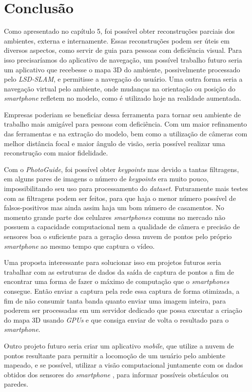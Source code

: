 \chapter{Conclusão}
Como apresentado no capítulo 5, foi possível obter reconstruções parciais dos ambientes, externa e internamente. Essas reconstruções podem ser úteis em diversos aspectos, como servir de guia para pessoas com deficiência visual. Para isso precisaríamos do aplicativo de navegação, um possível trabalho futuro seria um aplicativo que recebesse o mapa 3D do ambiente, possivelmente processado pelo \textit{LSD-SLAM}, e permitisse a navegação do usuário. Uma outra forma seria a navegação virtual pelo ambiente, onde mudanças na orientação ou posição do \textit{smartphone} refletem no modelo, como é utilizado hoje na realidade aumentada.

Empresas poderiam se beneficiar dessa ferramenta para tornar seu ambiente de trabalho mais amigável para pessoas com deficiência. Com um maior refinamento das ferramentas e na extração do modelo, bem como a utilização de câmeras com melhor distância focal e maior ângulo de visão, seria possível realizar uma reconstrução com maior fidelidade. 

 Com o \textit{PhotoGuide}, foi possível obter \textit{keypoints} mas devido a tantas filtragens, em alguns pares de imagens o número de \textit{keypoints} era muito pouco, impossibilitando seu uso para processamento do \textit{dataset}. Futuramente mais testes com as filtragens podem ser feitos, para que haja o menor número possível de falsos-positivos mas ainda assim haja um bom número de casamentos. No momento grande parte dos celulares \textit{smartphones} comuns no mercado não possuem a capacidade computacional nem a qualidade de câmera e precisão de sensores boa o suficiente para a geração dessa nuvem de pontos pelo próprio \textit{smartphone} ao mesmo tempo que captura o vídeo. 
 
 Uma proposta interessante para solucionar isso em projetos futuros seria trabalhar com as estruturas de dados da saída de captura de pontos a fim de encontrar uma forma de fazer o máximo de computação que o \textit{smartphones} consegue. Então enviar a captura pela rede essa captura de forma otimizada, a fim de não consumir tanta banda quanto enviar uma imagem inteira, para poderem ser processadas em um servidor dedicado que possa executar a criação do mapa 3D usando \textit{GPUs} e que consiga enviar de volta o resultado para o \textit{smartphone}.
	
Outro projeto futuro seria criar um aplicativo \textit{mobile}, que utilize a nuvem de pontos resultante para permitir a locomoção de um usuário pelo ambiente mapeado, e se possível, utilizar a visão computacional juntamente com os dados obtidos dos sensores do \textit{smartphone} , para informar possíveis obstáculos ou paredes.
